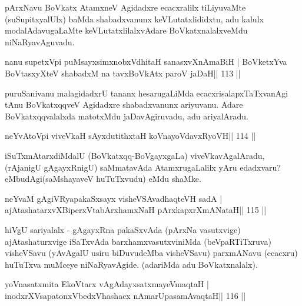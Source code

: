 \begin{artha}
pArxNavu BoVkatx AtamxneV Agidadxre ecacxralilx tiLiyuvaMte (suSupitxyalUlx) baMda shabadxvanunx keVLutatxlididxtu, adu kalulx modalAdavugaLaMte keVLutatxlilalxvAdare BoVkatxnalalxveMdu niNaRyavAguvadu.
\end{artha}


\begin{shl}
nanu supetxV\s pi puMsayxsimxnobxVdhitaH sanasxvXnAmaBiH |
BoVketxYva BoVtasxyXteV shabadxM na tavxBoVkAtx paroV jaDaH\hfill || 113 ||
\end{shl}

\begin{artha}
puruSanivanu malagidadxrU tananx hesarugaLiMda ecacxrisalapxTaTxvanAgi tAnu BoVkatxqqveV Agidadxre shabadxvanunx ariyuvanu. Adare BoVkatxqqvalalxda matotxMdu jaDavAgiruvadu, adu ariyalAradu.
\end{artha}

\begin{shl}
neYvAtoV\s pi viveVkaH sAyxdutithxtaH koV\s nayoVdavxRyoVH\hfill || 114 ||
\end{shl}

\begin{artha}
iSuTxmAtarxdiMdalU (BoVkatxqq-BoVgayxgaLa) viveVkavAgalAradu, (rAjanigU 
gAgayxRnigU) saMmatavAda AtamxrugaLalilx yAru edadxvaru? eMbudAgi\break (saMshayaveV huTuTxvudu) eMdu shaMke.
\end{artha}



\begin{shl}
neYvaM gAgiVRyapakaSxsayx visheVSAvadhaqteVH sadA |
ajAtashatarxvXBiperxVtabArxhamxNaH pArxkapxrXmANataH\hfill || 115 ||
\end{shl}

\begin{artha}
hiVgU sariyalalx - gAgayxRna pakaSxvAda (pArxNa vasutxvige) ajAtashaturxvige iSaTxvAda barxhamxvasutxviniMda (beVpaRTiTxruva) visheVSavu (yAvAgalU usiru biDuvudeMba visheVSavu) parxmANavu (ecacxru) huTuTxva muMceye niNaRyavAgide. (adariMda adu BoVkatxnalalx).
\end{artha}


\begin{shl}
yoV\s nasatxmita EkoV\s tarx vAgAdayxsatxmayeV\s maqtaH |
inodxrXV\s sapatonxV\s bedxVhashacx nAmarUpasamAvaqtaH\hfill || 116 ||
\end{shl}

